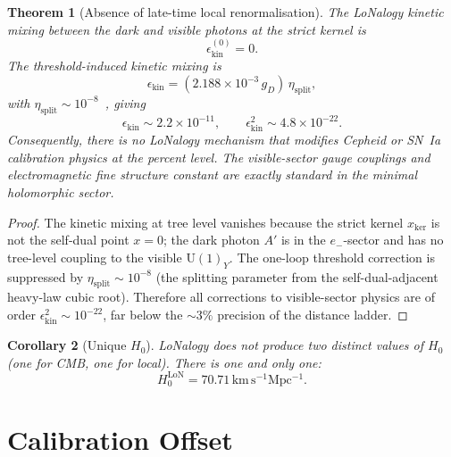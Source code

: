 \documentclass[12pt]{article}
\theoremstyle{plain}
\newtheorem{theorem}{Theorem}[section]
\newtheorem{corollary}[theorem]{Corollary}
\theoremstyle{definition}
\numberwithin{equation}{section}
\newcommand{\kker}{\mathrm{ker}}
\newcommand{\LoN}{\mathrm{LoN}}
\begin{document}
\begin{theorem}[Absence of late-time local renormalisation]\label{thm:norenorm}
The LoNalogy kinetic mixing between the dark and visible photons at the
strict kernel is
\begin{equation}
\epsilon_{\mathrm{kin}}^{(0)} = 0.
\end{equation}
The threshold-induced kinetic mixing is
\begin{equation}
\epsilon_{\mathrm{kin}} = (2.188\times10^{-3}\,g_D)\,\eta_{\mathrm{split}},
\end{equation}
with $\eta_{\mathrm{split}}\sim10^{-8}$~\cite{ParticleCosmo}, giving
\begin{equation}
\epsilon_{\mathrm{kin}} \sim 2.2\times10^{-11},
\qquad
\epsilon_{\mathrm{kin}}^2 \sim 4.8\times10^{-22}.
\end{equation}
Consequently, there is no LoNalogy mechanism that modifies Cepheid or
SN~Ia calibration physics at the percent level.  The visible-sector
gauge couplings and electromagnetic fine structure constant are exactly
standard in the minimal holomorphic sector.
\end{theorem}

\begin{proof}
The kinetic mixing at tree level vanishes because the strict kernel
$x_{\kker}$ is not the self-dual point $x=0$; the dark photon $A'$
is in the $e_-$-sector and has no tree-level coupling to the visible
$\mathrm{U}(1)_Y$.  The one-loop threshold correction is suppressed
by $\eta_{\mathrm{split}}\sim10^{-8}$ (the splitting parameter from
the self-dual-adjacent heavy-law cubic root).  Therefore all corrections
to visible-sector physics are of order $\epsilon_{\mathrm{kin}}^2\sim10^{-22}$,
far below the $\sim3\%$ precision of the distance ladder.
\end{proof}

\begin{corollary}[Unique $H_0$]\label{cor:uniqueH0}
LoNalogy does not produce two distinct values of $H_0$ (one for CMB,
one for local).  There is one and only one:
\begin{equation}
\boxed{H_0^{\LoN} = 70.71\,\mathrm{km\,s^{-1}Mpc^{-1}}.}
\end{equation}
\end{corollary}


\section{Calibration Offset}\label{sec:calibration}
\end{document}
